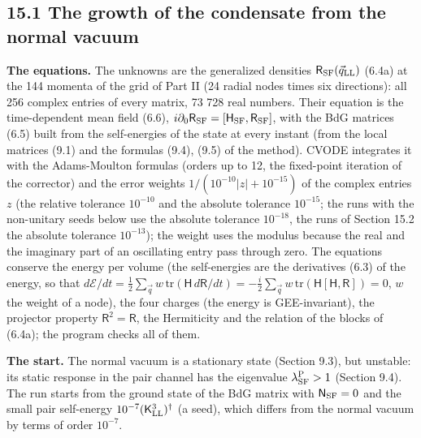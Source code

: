 \documentclass[
  10pt,
]{article}
\begin{document}
\hypertarget{the-growth-of-the-condensate-from-the-normal-vacuum}{%
\subsection{15.1 The growth of the condensate from the normal
vacuum}\label{the-growth-of-the-condensate-from-the-normal-vacuum}}

\textbf{The equations.} The unknowns are the generalized densities
\(\mathsf R_{\rm SF}(\vec q_{\rm LL})\) (6.4a) at the 144 momenta of the
grid of Part II (24 radial nodes times six directions): all 256 complex
entries of every matrix, 73 728 real numbers. Their equation is the
time-dependent mean field (6.6),
\(i\partial_0\mathsf R_{\rm SF}=[\mathsf H_{\rm SF},\mathsf R_{\rm SF}]\),
with the BdG matrices (6.5) built from the self-energies of the state at
every instant (from the local matrices (9.1) and the formulas (9.4),
(9.5) of the method). CVODE integrates it with the Adams-Moulton
formulas (orders up to 12, the fixed-point iteration of the corrector)
and the error weights \(1/(10^{-10}\lvert z\rvert+10^{-15})\) of the
complex entries \(z\) (the relative tolerance \(10^{-10}\) and the
absolute tolerance \(10^{-15}\); the runs with the non-unitary seeds
below use the absolute tolerance \(10^{-18}\), the runs of Section 15.2
the absolute tolerance \(10^{-13}\)); the weight uses the modulus
because the real and the imaginary part of an oscillating entry pass
through zero. The equations conserve the energy per volume (the
self-energies are the derivatives (6.3) of the energy, so that
\(d\mathcal E/dt=\tfrac12\sum_{\vec q}w\,\mathrm{tr}(\mathsf H\,d\mathsf R/dt)=-\tfrac i2\sum_{\vec q}w\,\mathrm{tr}(\mathsf H[\mathsf H,\mathsf R])=0\),
\(w\) the weight of a node), the four charges (the energy is
GEE-invariant), the projector property \(\mathsf R^2=\mathsf R\), the
Hermiticity and the relation of the blocks of (6.4a); the program checks
all of them.

\textbf{The start.} The normal vacuum is a stationary state (Section
9.3), but unstable: its static response in the pair channel has the
eigenvalue \(\lambda^{\rm P}_{\rm SF}>1\) (Section 9.4). The run starts
from the ground state of the BdG matrix with \(\mathsf N_{\rm SF}=0\)
and the small pair self-energy \(10^{-7}(\mathsf K^3_{\rm LL})^\dagger\)
(a seed), which differs from the normal vacuum by terms of order
\(10^{-7}\).
\end{document}

